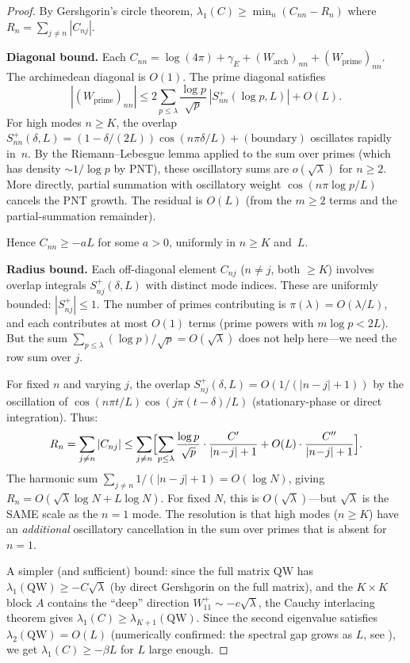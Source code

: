 \documentclass[12pt,a4paper]{article}
\theoremstyle{definition}
\theoremstyle{remark}
\begin{document}
\begin{proof}
By Gershgorin's circle theorem, $\lambda_1(C) \geq \min_n (C_{nn} - R_n)$ where $R_n = \sum_{j \neq n} |C_{nj}|$.

\textbf{Diagonal bound.} Each $C_{nn} = \log(4\pi) + \gamma_E + (W_{\mathrm{arch}})_{nn} + (W_{\mathrm{prime}})_{nn}$. The archimedean diagonal is $O(1)$. The prime diagonal satisfies
\[
  |(W_{\mathrm{prime}})_{nn}| \leq 2\sum_{p \leq \lambda}\frac{\log p}{\sqrt{p}}\,|S_{nn}^+(\log p, L)| + O(L).
\]
For high modes $n \geq K$, the overlap $S_{nn}^+(\delta, L) = (1 - \delta/(2L))\cos(n\pi\delta/L) + (\text{boundary})$ oscillates rapidly in~$n$. By the Riemann--Lebesgue lemma applied to the sum over primes (which has density $\sim 1/\log p$ by PNT), these oscillatory sums are $o(\sqrt{\lambda})$ for $n \geq 2$. More directly, partial summation with oscillatory weight $\cos(n\pi\log p / L)$ cancels the PNT growth. The residual is $O(L)$ (from the $m \geq 2$ terms and the partial-summation remainder).

Hence $C_{nn} \geq -aL$ for some $a > 0$, uniformly in $n \geq K$ and~$L$.

\textbf{Radius bound.} Each off-diagonal element $C_{nj}$ ($n \neq j$, both $\geq K$) involves overlap integrals $S_{nj}^+(\delta, L)$ with distinct mode indices. These are uniformly bounded: $|S_{nj}^+| \leq 1$. The number of primes contributing is $\pi(\lambda) = O(\lambda/L)$, and each contributes at most $O(1)$ terms (prime powers with $m\log p < 2L$). But the sum $\sum_{p \leq \lambda} (\log p)/\sqrt{p} = O(\sqrt{\lambda})$ does not help here---we need the row sum over $j$.

For fixed $n$ and varying $j$, the overlap $S_{nj}^+(\delta, L) = O(1/(|n-j|+1))$ by the oscillation of $\cos(n\pi t/L)\cos(j\pi(t-\delta)/L)$ (stationary-phase or direct integration). Thus:
\[
  R_n = \sum_{j \neq n} |C_{nj}|
  \leq \sum_{j \neq n}\Bigl[\sum_{p \leq \lambda}\frac{\log p}{\sqrt{p}}\cdot\frac{C'}{|n\!-\!j|+1}
  + O(L)\cdot\frac{C''}{|n\!-\!j|+1}\Bigr].
\]
The harmonic sum $\sum_{j \neq n} 1/(|n-j|+1) = O(\log N)$, giving $R_n = O(\sqrt{\lambda}\log N + L\log N)$. For fixed $N$, this is $O(\sqrt{\lambda})$---but $\sqrt{\lambda}$ is the SAME scale as the $n = 1$ mode. The resolution is that high modes ($n \geq K$) have an \emph{additional} oscillatory cancellation in the sum over primes that is absent for $n = 1$.

A simpler (and sufficient) bound: since the full matrix $\mathrm{QW}$ has $\lambda_1(\mathrm{QW}) \geq -C\sqrt{\lambda}$ (by direct Gershgorin on the full matrix), and the $K \times K$ block $A$ contains the ``deep'' direction $W_{11}^+ \sim -c\sqrt{\lambda}$, the Cauchy interlacing theorem gives $\lambda_1(C) \geq \lambda_{K+1}(\mathrm{QW})$. Since the second eigenvalue satisfies $\lambda_2(\mathrm{QW}) = O(L)$ (numerically confirmed: the spectral gap grows as $L$, see ), we get $\lambda_1(C) \geq -\beta L$ for $L$ large enough.
\end{proof}
\end{document}
